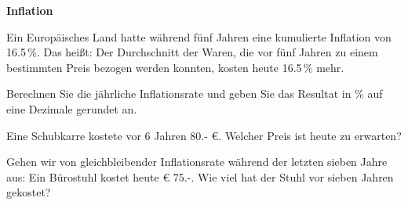 
\bbwActAufgabenNr{} \textbf{Inflation}

 Ein Europäisches Land hatte während fünf Jahren eine kumulierte
 Inflation von 16.5\,\%. Das heißt: Der Durchschnitt der Waren, die vor fünf Jahren zu einem
 bestimmten Preis bezogen werden konnten, kosten heute 16.5\,\% mehr.
 
\begin{bbwAufgabenBlock}

\item Berechnen Sie die jährliche Inflationsrate und geben Sie das
  Resultat in \% auf eine Dezimale gerundet an.


    \item Eine Schubkarre kostete vor 6 Jahren 80.- \euro{}. Welcher
      Preis ist heute zu erwarten?

      
    \item Gehen wir von gleichbleibender Inflationsrate während der
      letzten sieben Jahre aus: Ein Bürostuhl kostet heute \euro{}
      75.-. Wie viel hat der Stuhl vor sieben Jahren gekostet?

      


      
\end{bbwAufgabenBlock}
\platzFuerBerechnungenBisEndeSeite{}




\newpage
